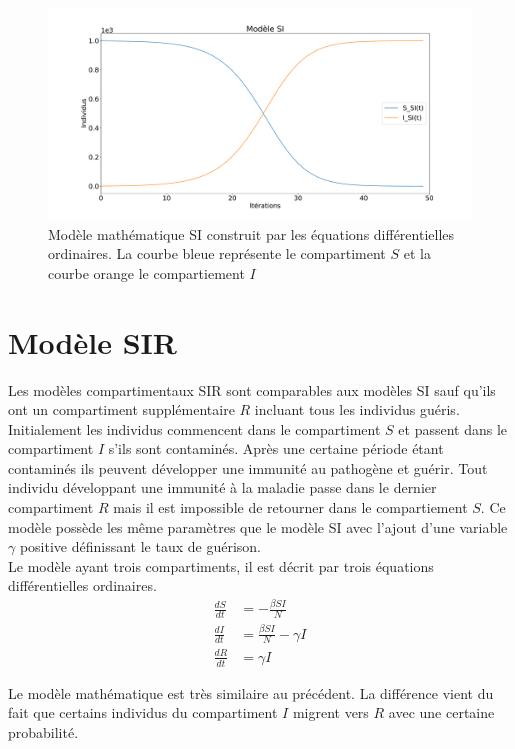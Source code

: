 \begin{figure}[h]
\centering
\captionsetup{justification=centering}
\includegraphics[width=1\textwidth]{Images/SI_exemple.pdf}
\caption[Modèle mathématique SI]{Modèle mathématique SI construit par les équations différentielles ordinaires. La courbe bleue représente le compartiment $S$ et la courbe orange le compartiement $I$}
\end{figure}

\section{Modèle SIR}

Les modèles compartimentaux SIR sont comparables aux modèles SI sauf qu'ils ont un compartiment supplémentaire $R$ incluant tous les individus guéris. Initialement les individus commencent dans le compartiment $S$ et passent dans le compartiment $I$ s'ils sont contaminés. Après une certaine période étant contaminés ils peuvent développer une immunité au pathogène et guérir. Tout individu développant une immunité à la maladie passe dans le dernier compartiment $R$ mais il est impossible de retourner dans le compartiement $S$. Ce modèle possède les même paramètres que le modèle SI avec l'ajout d'une variable $\gamma$ positive définissant le taux de guérison.\\

Le modèle ayant trois compartiments, il est décrit par trois équations différentielles ordinaires.
\begin{align}
    \frac{dS}{dt} &= -\frac{\beta S I}{N}\\
    \frac{dI}{dt} &= \frac{\beta S I}{N} - \gamma I\\
    \frac{dR}{dt} &= \gamma I
\end{align}

Le modèle mathématique est très similaire au précédent. La différence vient du fait que certains individus du compartiment $I$ migrent vers $R$ avec une certaine probabilité.\\

